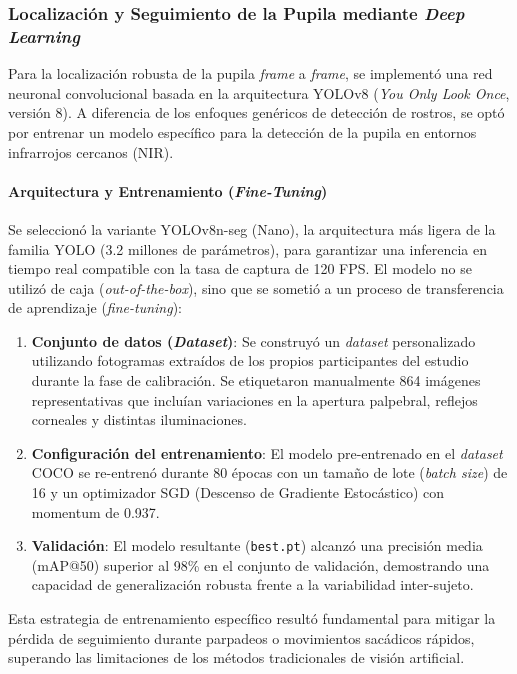 \subsubsection{Localización y Seguimiento de la Pupila mediante \textit{Deep Learning}}

Para la localización robusta de la pupila \textit{frame} a \textit{frame}, se implementó una red neuronal convolucional basada en la arquitectura YOLOv8 (\textit{You Only Look Once}, versión 8).
A diferencia de los enfoques genéricos de detección de rostros, se optó por entrenar un modelo específico para la detección de la pupila en entornos infrarrojos cercanos (NIR).

\paragraph{Arquitectura y Entrenamiento (\textit{Fine-Tuning})}
Se seleccionó la variante YOLOv8n-seg (Nano), la arquitectura más ligera de la familia YOLO (3.2 millones de parámetros), para garantizar una inferencia en tiempo real compatible con la tasa de captura de 120 FPS.
El modelo no se utilizó de caja (\textit{out-of-the-box}), sino que se sometió a un proceso de transferencia de aprendizaje (\textit{fine-tuning}):

\begin{enumerate}
	\item \textbf{Conjunto de datos (\textit{Dataset})}: Se construyó un \textit{dataset} personalizado utilizando fotogramas extraídos de los propios participantes del estudio durante la fase de calibración.
	Se etiquetaron manualmente 864 imágenes representativas que incluían variaciones en la apertura palpebral, reflejos corneales y distintas iluminaciones.
	\item \textbf{Configuración del entrenamiento}: El modelo pre-entrenado en el \textit{dataset} COCO se re-entrenó durante 80 épocas con un tamaño de lote (\textit{batch size}) de 16 y un optimizador SGD (Descenso de Gradiente Estocástico) con momentum de 0.937.
	\item \textbf{Validación}: El modelo resultante (\texttt{best.pt}) alcanzó una precisión media (mAP@50) superior al 98\% en el conjunto de validación, demostrando una capacidad de generalización robusta frente a la variabilidad inter-sujeto.
\end{enumerate}

Esta estrategia de entrenamiento específico resultó fundamental para mitigar la pérdida de seguimiento durante parpadeos o movimientos sacádicos rápidos, superando las limitaciones de los métodos tradicionales de visión artificial.

